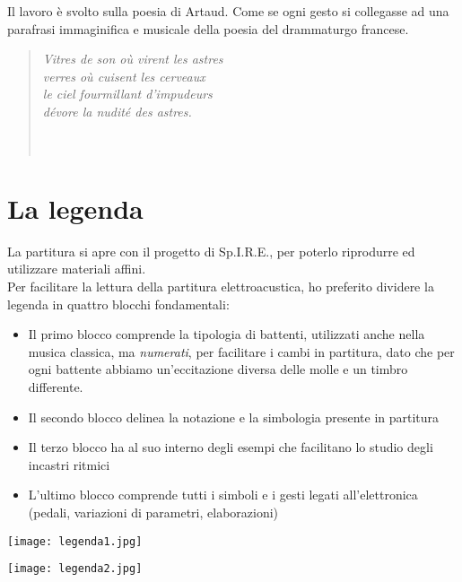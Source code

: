Il lavoro è svolto sulla poesia di Artaud. Come se ogni gesto si collegasse ad una parafrasi immaginifica e musicale della poesia del drammaturgo francese. \\

\begin{quotation}
\textit{Vitres de son où virent les astres \\
verres où cuisent les cerveaux \\
le ciel fourmillant d'impudeurs \\
dévore la nudité des astres. \\ \\ \\}
\end{quotation}





\section{La legenda}
La partitura si apre con il progetto di Sp.I.R.E., per poterlo riprodurre ed utilizzare materiali affini.\\
Per facilitare la lettura della partitura elettroacustica, ho preferito dividere la legenda in quattro blocchi fondamentali:
\begin{itemize}
\item{Il primo blocco comprende la tipologia di battenti, utilizzati anche nella musica classica, ma \textit{numerati}, per facilitare i cambi in partitura, dato che per ogni battente abbiamo un'eccitazione diversa delle molle e un timbro differente.}
\item{Il secondo blocco delinea la notazione e la simbologia presente in partitura}
\item{Il terzo blocco ha al suo interno degli esempi che facilitano lo studio degli incastri ritmici}
\item{L'ultimo blocco comprende tutti i simboli e i gesti legati all'elettronica (pedali, variazioni di parametri, elaborazioni)}
\end{itemize}


\begin{center}
\begin{minipage}[c]{1.\textwidth}
\texttt{[image: legenda1.jpg]}
\end{minipage}
\end{center}


\begin{center}
\begin{minipage}[c]{1.\textwidth}
\texttt{[image: legenda2.jpg]}
\end{minipage}
\end{center}


